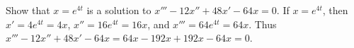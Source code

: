 {Show that $x = e^{4t}$ is a solution to $x'''-12 x'' + 48 x' - 64 x = 0$.}
{If $x=e^{4t}$, then $x' = 4e^{4t}=4x$, $x'' = 16e^{4t} = 16x$, and $x''' = 64e^{4t} = 64x$. Thus $x'''-12x''+48x'-64x = 64x-192x+192x-64x=0$.}